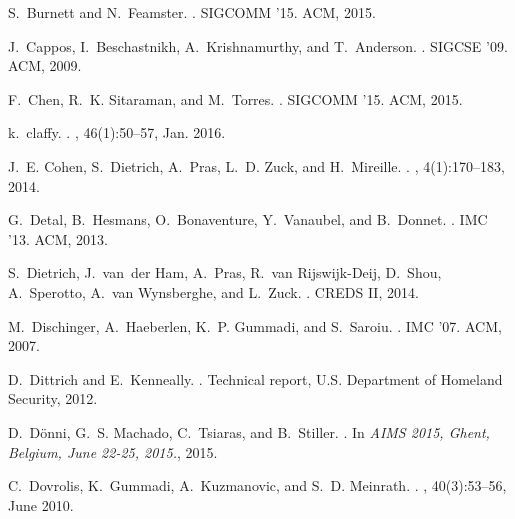 \documentclass{sigcomm-alternate}
\begin{document}
\begin{thebibliography}{10}
S.~Burnett and N.~Feamster.
.
\newblock SIGCOMM '15. ACM, 2015.

J.~Cappos, I.~Beschastnikh, A.~Krishnamurthy, and T.~Anderson.
.
\newblock SIGCSE '09. ACM, 2009.

F.~Chen, R.~K. Sitaraman, and M.~Torres.
.
\newblock SIGCOMM '15. ACM, 2015.

k.~claffy.
.
, 46(1):50--57, Jan. 2016.

J.~E. Cohen, S.~Dietrich, A.~Pras, L.~D. Zuck, and H.~Mireille.
.
, 4(1):170--183, 2014.

G.~Detal, B.~Hesmans, O.~Bonaventure, Y.~Vanaubel, and B.~Donnet.
.
\newblock IMC '13. ACM, 2013.

S.~Dietrich, J.~van~der Ham, A.~Pras, R.~van Rijswijk-Deij, D.~Shou,
  A.~Sperotto, A.~van Wynsberghe, and L.~Zuck.
.
\newblock CREDS II, 2014.

M.~Dischinger, A.~Haeberlen, K.~P. Gummadi, and S.~Saroiu.
.
\newblock IMC '07. ACM, 2007.

D.~Dittrich and E.~Kenneally.
.
\newblock Technical report, U.S. Department of Homeland Security, 2012.

D.~D{\"{o}}nni, G.~S. Machado, C.~Tsiaras, and B.~Stiller.
.
\newblock In {\em {AIMS} 2015, Ghent, Belgium, June 22-25, 2015.}, 2015.

C.~Dovrolis, K.~Gummadi, A.~Kuzmanovic, and S.~D. Meinrath.
.
, 40(3):53--56, June 2010.


\end{thebibliography}
\end{document}
